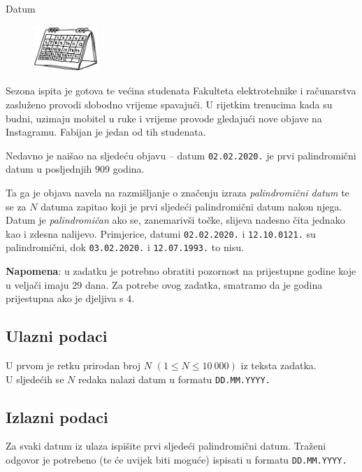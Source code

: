 \begin{statement}[
  problempoints=50,
  timelimit=1 sekunda,
  memorylimit=512 MiB,
]{Datum}

\setlength\intextsep{-0.1cm}
\begin{figure}
\centering
\includegraphics[width=0.22\textwidth]{img/datum.png}
\end{figure}

Sezona ispita je gotova te većina studenata Fakulteta elektrotehnike i
računarstva zasluženo provodi slobodno vrijeme spavajući. U rijetkim
trenucima kada su budni, uzimaju mobitel u ruke i vrijeme provode gledajući
nove objave na Instagramu. Fabijan je jedan od tih studenata.

Nedavno je naišao na sljedeću objavu -- datum \texttt{02.02.2020.} je prvi
palindromični datum u posljednjih $909$ godina.

 Ta ga je objava navela na razmišljanje o značenju izraza \textit{palindromični
datum} te se za $N$ datuma zapitao koji je prvi sljedeći palindromični datum
nakon njega. Datum je \textit{palindromičan} ako se, zanemarivši točke,
slijeva nadesno čita jednako kao i zdesna nalijevo. Primjerice, datumi
\texttt{02.02.2020.} i \texttt{12.10.0121.} su palindromični, dok
\texttt{03.02.2020.} i \texttt{12.07.1993.} to nisu.

\textbf{Napomena}: u zadatku je potrebno obratiti pozornost na prijestupne
godine koje u veljači imaju $29$ dana. Za potrebe ovog zadatka, smatramo da je
godina prijestupna ako je djeljiva s $4$.

\subsection*{Ulazni podaci}
U prvom je retku prirodan broj $N$ $(1 \le N \le 10\ 000)$ iz teksta zadatka.\\
U sljedećih se $N$ redaka nalazi datum u formatu \texttt{DD.MM.YYYY.}

\subsection*{Izlazni podaci}
Za svaki datum iz ulaza ispišite prvi sljedeći palindromični datum. Traženi
odgovor je potrebeno (te će uvijek biti moguće) ispisati u formatu
\texttt{DD.MM.YYYY.}


\end{statement}
